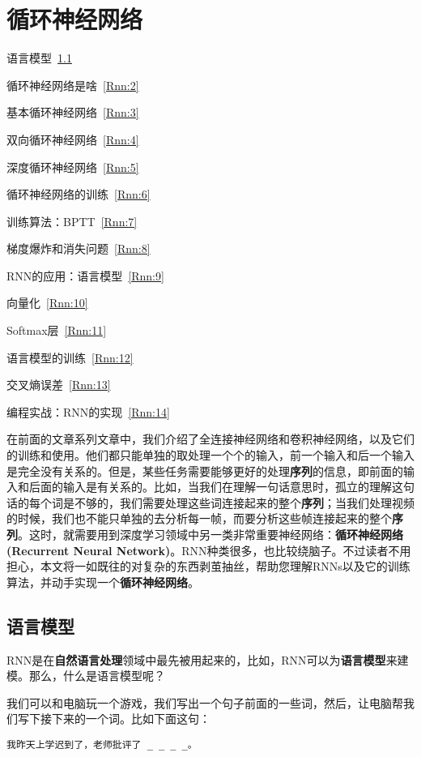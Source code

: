 \chapter{循环神经网络}\label{chap:Rnn}

\begin{introduction}
	\item 语言模型~\ref{Rnn:1}
	\item 循环神经网络是啥~\ref{Rnn:2}
	\item 基本循环神经网络~\ref{Rnn:3}
	\item 双向循环神经网络~\ref{Rnn:4}
	\item 深度循环神经网络~\ref{Rnn:5}
	\item 循环神经网络的训练~\ref{Rnn:6}
	\item 训练算法：BPTT~\ref{Rnn:7}
	\item 梯度爆炸和消失问题~\ref{Rnn:8}
	\item RNN的应用：语言模型~\ref{Rnn:9}
	\item 向量化~\ref{Rnn:10}
	\item Softmax层~\ref{Rnn:11}
	\item 语言模型的训练~\ref{Rnn:12}
	\item 交叉熵误差~\ref{Rnn:13}
	\item 编程实战：RNN的实现~\ref{Rnn:14}
\end{introduction}


在前面的文章系列文章中，我们介绍了全连接神经网络和卷积神经网络，以及它们的训练和使用。他们都只能单独的取处理一个个的输入，前一个输入和后一个输入是完全没有关系的。但是，某些任务需要能够更好的处理\textbf{序列}的信息，即前面的输入和后面的输入是有关系的。比如，当我们在理解一句话意思时，孤立的理解这句话的每个词是不够的，我们需要处理这些词连接起来的整个\textbf{序列}；当我们处理视频的时候，我们也不能只单独的去分析每一帧，而要分析这些帧连接起来的整个\textbf{序列}。这时，就需要用到深度学习领域中另一类非常重要神经网络：\textbf{循环神经网络(Recurrent Neural Network)}。RNN种类很多，也比较绕脑子。不过读者不用担心，本文将一如既往的对复杂的东西剥茧抽丝，帮助您理解RNNs以及它的训练算法，并动手实现一个\textbf{循环神经网络}。


\section{语言模型}\label{Rnn:1}


RNN是在\textbf{自然语言处理}领域中最先被用起来的，比如，RNN可以为\textbf{语言模型}来建模。那么，什么是语言模型呢？

我们可以和电脑玩一个游戏，我们写出一个句子前面的一些词，然后，让电脑帮我们写下接下来的一个词。比如下面这句：
\begin{lstlisting}[numbers=none]
    我昨天上学迟到了，老师批评了 _ _ _ _。
\end{lstlisting}

